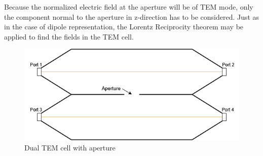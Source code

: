 Because the normalized electric field at the aperture will be of TEM mode, only the component normal to the aperture in z-direction has to be considered. Just as in the case of dipole representation, the Lorentz Reciprocity theorem may be applied to find the fields in the TEM cell. 

\begin{figure}[h]
    \centering
    \includegraphics[width=0.75\linewidth]{Documentation//content//10_theory//img/dual_tem_cell.png}
    \caption{Dual TEM cell with aperture}
    \label{fig:dual_tem_cell}
\end{figure}

